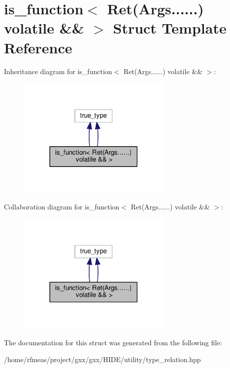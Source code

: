 \hypertarget{structis__function_3_01Ret_07Args_8_8_8_8_8_8_08_01volatile_01_6_6_01_4}{}\section{is\+\_\+function$<$ Ret(Args......) volatile \&\& $>$ Struct Template Reference}
\label{structis__function_3_01Ret_07Args_8_8_8_8_8_8_08_01volatile_01_6_6_01_4}


Inheritance diagram for is\+\_\+function$<$ Ret(Args......) volatile \&\& $>$\+:
\nopagebreak
\begin{figure}[H]
\begin{center}
\leavevmode
\includegraphics[width=213pt]{structis__function_3_01Ret_07Args_8_8_8_8_8_8_08_01volatile_01_6_6_01_4__inherit__graph}
\end{center}
\end{figure}


Collaboration diagram for is\+\_\+function$<$ Ret(Args......) volatile \&\& $>$\+:
\nopagebreak
\begin{figure}[H]
\begin{center}
\leavevmode
\includegraphics[width=213pt]{structis__function_3_01Ret_07Args_8_8_8_8_8_8_08_01volatile_01_6_6_01_4__coll__graph}
\end{center}
\end{figure}


The documentation for this struct was generated from the following file\+:\begin{DoxyCompactItemize}
\item 
/home/rfmeas/project/gxx/gxx/\+H\+I\+D\+E/utility/type\+\_\+relation.\+hpp\end{DoxyCompactItemize}
